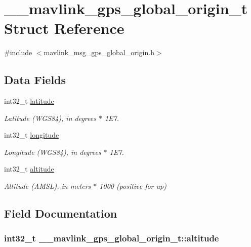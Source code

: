 \hypertarget{struct____mavlink__gps__global__origin__t}{\section{\+\_\+\+\_\+mavlink\+\_\+gps\+\_\+global\+\_\+origin\+\_\+t Struct Reference}
\label{struct____mavlink__gps__global__origin__t}
}


{\ttfamily \#include $<$mavlink\+\_\+msg\+\_\+gps\+\_\+global\+\_\+origin.\+h$>$}

\subsection*{Data Fields}
\begin{DoxyCompactItemize}
\item 
int32\+\_\+t \hyperlink{struct____mavlink__gps__global__origin__t_ab78807fb15062419bf5452c3294235bc}{latitude}
\begin{DoxyCompactList}\small\item\em Latitude (W\+G\+S84), in degrees $\ast$ 1\+E7. \end{DoxyCompactList}\item 
int32\+\_\+t \hyperlink{struct____mavlink__gps__global__origin__t_a52156dc446e0be0bc5cbf4247e194349}{longitude}
\begin{DoxyCompactList}\small\item\em Longitude (W\+G\+S84), in degrees $\ast$ 1\+E7. \end{DoxyCompactList}\item 
int32\+\_\+t \hyperlink{struct____mavlink__gps__global__origin__t_a34577699f6c0ef2517eb8b16da733c15}{altitude}
\begin{DoxyCompactList}\small\item\em Altitude (A\+M\+S\+L), in meters $\ast$ 1000 (positive for up) \end{DoxyCompactList}\end{DoxyCompactItemize}


\subsection{Field Documentation}
\hypertarget{struct____mavlink__gps__global__origin__t_a34577699f6c0ef2517eb8b16da733c15}{
\subsubsection[{altitude}]{\setlength{\rightskip}{0pt plus 5cm}int32\+\_\+t \+\_\+\+\_\+mavlink\+\_\+gps\+\_\+global\+\_\+origin\+\_\+t\+::altitude}}\label{struct____mavlink__gps__global__origin__t_a34577699f6c0ef2517eb8b16da733c15}


